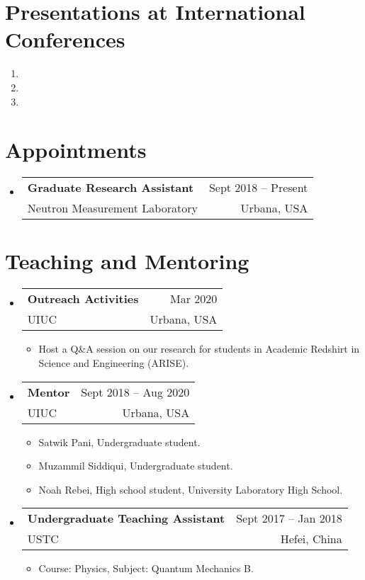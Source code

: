 \documentclass[letterpaper,11pt]{article} %
\makeatletter
\newcommand{\CVItem}[1]{
  \item\small{
    {#1 \vspace{-2pt}}
  }
}
\newcommand{\CVSubheading}[4]{
  \vspace{-2pt}\item
    \begin{tabular*}{0.97\textwidth}[t]{l@{\extracolsep{\fill}}r}
      \textbf{#1} & #2 \\
      \small#3 & \small #4 \\
    \end{tabular*}\vspace{-7pt}
}
\newcommand{\CVSubHeadingListStart}{\begin{itemize}[leftmargin=0.5cm, label={}]}
\newcommand{\CVSubHeadingListEnd}{\end{itemize}}
\newcommand{\CVItemListStart}{\begin{itemize}}
\newcommand{\CVItemListEnd}{\end{itemize}\vspace{-5pt}}
\makeatother
\begin{document}
\begin{comment}
Again the title should have already been enough, but if it is necessary to add
descriptions maintain the consistency from prior sections
\end{comment}
\section{Presentations at International Conferences}
    \begin{enumerate}
        \item {}
        \item {}
        \item {}
    \end{enumerate}
 
\begin{comment}
Section is here as it applied to my application for positions in academia. 
Remember to tailor the resume for to the position.
\end{comment}
\section{Appointments}
\CVSubHeadingListStart
    \CVSubheading
      {Graduate Research Assistant}{Sept 2018 – Present}
      {Neutron Measurement Laboratory}{Urbana, USA}
  \CVSubHeadingListEnd

\section{Teaching and Mentoring}
\CVSubHeadingListStart
    \CVSubheading
      {Outreach Activities}{Mar 2020}
      {UIUC}{Urbana, USA}
      \CVItemListStart
        \CVItem{Host a Q\&A session on our research for students in Academic Redshirt in Science and Engineering (ARISE).}
      \CVItemListEnd
    \CVSubheading
      {Mentor}{Sept 2018 – Aug 2020}
      {UIUC}{Urbana, USA}
      \CVItemListStart
        \CVItem{Satwik Pani, Undergraduate student.}
        \CVItem{Muzammil Siddiqui, Undergraduate student.}
        \CVItem{Noah Rebei, High school student, University Laboratory High School.}
      \CVItemListEnd
    \CVSubheading
      {Undergraduate Teaching Assistant}{Sept 2017 – Jan 2018}
      {USTC}{Hefei, China}
      \CVItemListStart
        \CVItem{Course: Physics, Subject: Quantum Mechanics B.}
      \CVItemListEnd
  \CVSubHeadingListEnd
\end{document}
